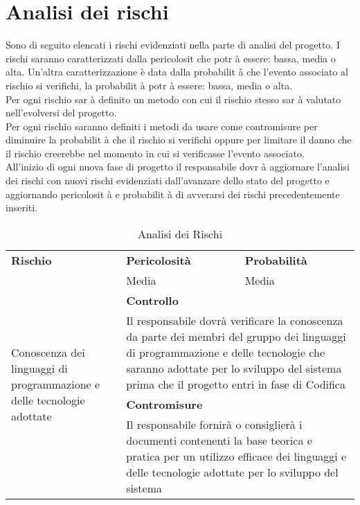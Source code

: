 \section{Analisi dei rischi}{
Sono di seguito elencati i rischi evidenziati nella parte di analisi del progetto. 
I rischi saranno caratterizzati dalla pericolosit che potr \`{a} essere: bassa, media o alta.
Un'altra caratterizzazione  \`{e} data dalla probabilit \`{a} che l'evento associato al rischio si verifichi, la probabilit \`{a} potr \`{a} essere: bassa, media o alta.\\
Per ogni rischio sar \`{a} definito un metodo con cui il rischio stesso sar \`{a} valutato nell'evolversi del progetto.\\
Per ogni rischio saranno definiti i metodi da usare come contromisure per diminuire la probabilit \`{a} che il rischio si verifichi oppure per limitare il danno che il rischio creerebbe nel momento in cui si verificasse l'evento associato.\\
All'inizio di ogni nuova fase di progetto il responsabile dovr \`{a} aggiornare l'analisi dei rischi con nuovi rischi evidenziati dall'avanzare dello stato del progetto e aggiornando pericolosit \`{a} e probabilit \`{a} di avverarsi dei rischi precedentemente inseriti.

	\begin{table}[H]
		\centering
		\begin{tabularx}{\textwidth}{p{}|p{}p{}}
				\hline
			   \textbf{Rischio} & \textbf{Pericolosit\`{a}} & \textbf{Probabilit\`{a}} \\
			   \multirow{5}{3cm}{Conoscenza dei linguaggi di programmazione e delle tecnologie adottate} & Media & Media\\
			   & \multicolumn{2}{p{0.7\textwidth}}{\textbf{Controllo}} \\
			   & \multicolumn{2}{p{0.7\textwidth}}{Il responsabile dovr\`{a} verificare la conoscenza da parte dei membri del gruppo dei linguaggi di programmazione e delle tecnologie che saranno adottate per lo sviluppo del sistema prima che il progetto entri in fase di Codifica} \\
			   & \multicolumn{2}{p{0.7\textwidth}}{\textbf{Contromisure}}\\
			   & \multicolumn{2}{p{0.7\textwidth}}{Il responsabile fornir\`{a} o consiglier\`{a} i documenti contenenti la base teorica e pratica per un utilizzo efficace dei linguaggi e delle tecnologie adottate per lo sviluppo del sistema} \\
			   \hline
		 \end{tabularx}
		 	\label{tab:analisirischi}
		 	\caption{Analisi dei Rischi}
		\end{table}
}

